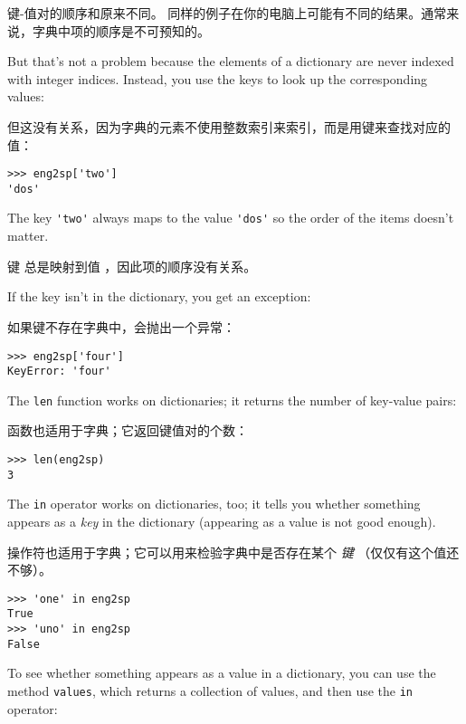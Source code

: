 键-值对的顺序和原来不同。
同样的例子在你的电脑上可能有不同的结果。通常来说，字典中项的顺序是不可预知的。

But that's not a problem because
the elements of a dictionary are never indexed with integer indices.
Instead, you use the keys to look up the corresponding values:

但这没有关系，因为字典的元素不使用整数索引来索引，而是用键来查找对应的值：

\begin{lstlisting}
>>> eng2sp['two']
'dos'
\end{lstlisting}

%
The key \verb"'two'" always maps to the value \verb"'dos'" so the order
of the items doesn't matter.

键  总是映射到值  ，因此项的顺序没有关系。

If the key isn't in the dictionary, you get an exception:

如果键不存在字典中，会抛出一个异常：

  

\begin{lstlisting}
>>> eng2sp['four']
KeyError: 'four'
\end{lstlisting}

%
The {\tt len} function works on dictionaries; it returns the
number of key-value pairs:

 函数也适用于字典；它返回键值对的个数：

  

\begin{lstlisting}
>>> len(eng2sp)
3
\end{lstlisting}

%
The {\tt in} operator works on dictionaries, too; it tells you whether
something appears as a {\em key} in the dictionary (appearing
as a value is not good enough).

 操作符也适用于字典；它可以用来检验字典中是否存在某个 {\em 键} （仅仅有这个值还不够）。

  

\begin{lstlisting}
>>> 'one' in eng2sp
True
>>> 'uno' in eng2sp
False
\end{lstlisting}

%
To see whether something appears as a value in a dictionary, you
can use the method {\tt values}, which returns a collection of
values, and then use the {\tt in} operator:

